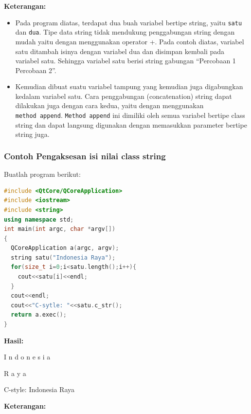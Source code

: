 \textbf{Keterangan:}

\begin{itemize}

\item
  Pada program diatas, terdapat dua buah variabel bertipe string, yaitu
  \texttt{satu} dan \texttt{dua}. Tipe data string tidak mendukung
  penggabungan string dengan mudah yaitu dengan menggunakan operator +.
  Pada contoh diatas, variabel satu ditambah isinya dengan variabel dua
  dan disimpan kembali pada variabel satu. Sehingga variabel satu berisi
  string gabungan ``Percobaan 1 Percobaan 2''.
\item
  Kemudian dibuat suatu variabel tampung yang kemudian juga digabungkan
  kedalam variabel satu. Cara penggabungan (concatenation) string dapat
  dilakukan juga dengan cara kedua, yaitu dengan menggunakan
  \texttt{method\ append}. \texttt{Method\ append} ini dimiliki oleh
  semua variabel bertipe class string dan dapat langsung digunakan
  dengan memasukkan parameter bertipe string juga.
\end{itemize}

\subsubsection*{Contoh  Pengaksesan isi nilai class string}

Buatlah program berikut:

\begin{lstlisting}[language=c++, caption=Pengaksesan isi nilai class string, label=contoh3-28]
#include <QtCore/QCoreApplication>
#include <iostream>
#include <string>
using namespace std;
int main(int argc, char *argv[])
{
  QCoreApplication a(argc, argv);
  string satu("Indonesia Raya");
  for(size_t i=0;i<satu.length();i++){
    cout<<satu[i]<<endl;
  }
  cout<<endl;
  cout<<"C-sytle: "<<satu.c_str();
  return a.exec();
}
\end{lstlisting}

\textbf{Hasil:}

\begin{lcverbatim}
I
n
d
o
n
e
s
i
a


R
a
y
a

C-style: Indonesia Raya
\end{lcverbatim}

\textbf{Keterangan:}

